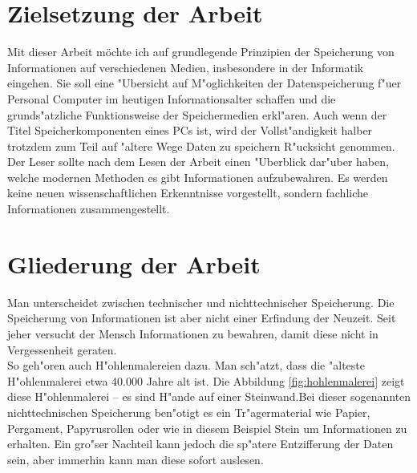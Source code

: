 \section{Zielsetzung der Arbeit}
\label{ch:Einleitung:sec:Zielsetzung}

Mit dieser Arbeit möchte ich auf grundlegende Prinzipien der Speicherung von Informationen auf verschiedenen Medien, insbesondere in der Informatik eingehen. Sie soll eine "Ubersicht auf M"oglichkeiten der Datenspeicherung f"uer Personal Computer im heutigen Informationsalter schaffen und die grunds"atzliche Funktionsweise der Speichermedien erkl"aren. Auch wenn der Titel \glqq Speicherkomponenten eines PCs \grqq{} ist, wird der Vollst"andigkeit halber trotzdem zum Teil auf "altere Wege Daten zu speichern R"ucksicht genommen. Der Leser sollte nach dem Lesen der Arbeit einen "Uberblick dar"uber haben, welche modernen Methoden es gibt Informationen aufzubewahren. Es werden keine neuen wissenschaftlichen Erkenntnisse vorgestellt, sondern fachliche Informationen zusammengestellt.

\section{Gliederung der Arbeit}
\label{ch:Einleitung:sec:Gliederung}

Man unterscheidet zwischen technischer und nichttechnischer Speicherung. Die Speicherung von Informationen ist aber nicht einer Erfindung der Neuzeit. Seit jeher versucht der Mensch Informationen zu bewahren, damit diese nicht in Vergessenheit geraten. 
\\
So geh"oren auch H"ohlenmalereien dazu. Man sch"atzt, dass die "alteste H"ohlenmalerei etwa 40.000 Jahre alt ist. Die Abbildung \ref{fig:hohlenmalerei}  zeigt diese H"ohlenmalerei – es sind H"ande auf einer Steinwand.Bei dieser sogenannten nichttechnischen Speicherung ben"otigt es ein Tr"agermaterial wie Papier, Pergament, Papyrusrollen oder wie in diesem Beispiel Stein um Informationen zu erhalten. Ein gro"ser Nachteil kann jedoch die sp"atere Entzifferung der \glqq Daten\grqq{} sein, aber immerhin kann man diese sofort auslesen.

